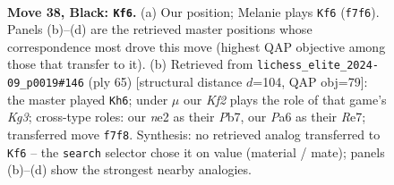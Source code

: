 \documentclass[11pt]{article}
\begin{document}
\clearpage

\begin{figure}[p]\centering
\begin{subfigure}{0.46\textwidth}\centering
\resizebox{\linewidth}{!}{%
\newchessgame
\chessboard[
  setfen={1r6/2R1nk1Q/p2p2p1/3qr2p/Rp2p2P/8/4NPP1/5K2 b - - 3 38},
  showmover=false,
  pgfstyle=straightmove, color=movearrow, markmove={f7-f6}
]}
\caption{}
\end{subfigure}\hfill
\begin{subfigure}{0.46\textwidth}\centering
\resizebox{\linewidth}{!}{%
\newchessgame
\chessboard[
  setfen={6Q1/1p2r3/1qp2pk1/p3p3/n3P3/2P2NPP/1n4BK/1R6 b - - 1 33},
  showmover=false,
  pgfstyle=straightmove, color=movearrow, markmove={g6-h6}
]}
\caption{}
\end{subfigure}
\\[4pt]

\caption{\textbf{Move 38, Black: \texttt{Kf6}.} (a) Our position; Melanie plays \texttt{Kf6} (\texttt{f7f6}). Panels (b)--(d) are the retrieved master positions whose correspondence most drove this move (highest QAP objective among those that transfer to it). (b) Retrieved from \texttt{lichess\_elite\_2024-09\_p0019\#146} (ply 65) [structural distance $d$=104, QAP obj=79]: the master played \texttt{Kh6}; under $\mu$ our \emph{Kf2} plays the role of that game's \emph{Kg3}; cross-type roles: our \emph{n}e2 as their \emph{P}b7, our \emph{P}a6 as their \emph{R}e7; transferred move \texttt{f7f8}. Synthesis: no retrieved analog transferred to \texttt{Kf6} -- the \texttt{search} selector chose it on value (material / mate); panels (b)--(d) show the strongest nearby analogies.}
\label{fig:thought-m75}
\end{figure}

\clearpage
\end{document}
